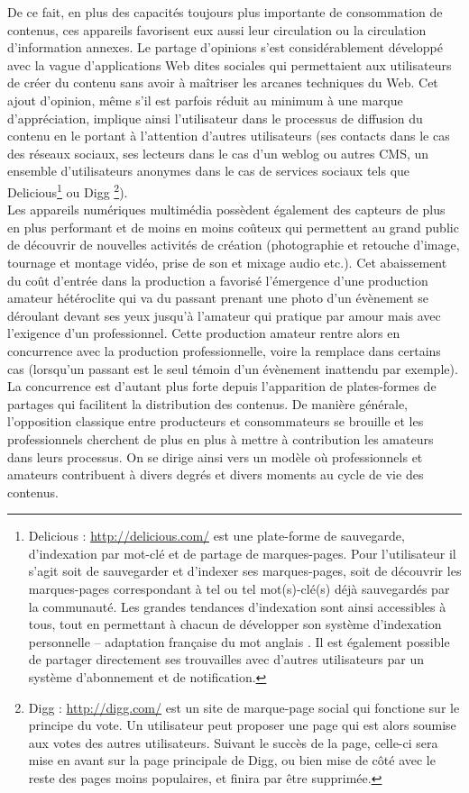 De ce fait, en plus des capacités toujours plus importante de consommation de contenus, ces appareils favorisent eux aussi leur circulation ou la circulation d’information annexes. 
Le partage d’opinions s’est considérablement développé avec la vague d'applications Web dites sociales qui permettaient aux utilisateurs de créer du contenu sans avoir à maîtriser les arcanes techniques du Web. 
Cet ajout d’opinion, même s’il est parfois réduit au minimum à une marque d'appréciation, implique ainsi l’utilisateur dans le processus de diffusion du contenu en le portant à l'attention d'autres utilisateurs (ses contacts dans le cas des réseaux sociaux, ses lecteurs dans le cas d'un weblog ou autres CMS, un ensemble d'utilisateurs anonymes dans le cas de services sociaux tels que Delicious\footnote{Delicious : \url{http://delicious.com/} est une plate-forme de sauvegarde, d'indexation par mot-clé et de partage de marques-pages. Pour l'utilisateur il s'agit soit de sauvegarder et d'indexer ses marques-pages, soit de découvrir les marques-pages correspondant à tel ou tel mot(s)-clé(s) déjà sauvegardés par la communauté. Les grandes tendances d'indexation sont ainsi accessibles à tous, tout en permettant à chacun de développer son système d'indexation personnelle -- adaptation française du mot anglais . Il est également possible de partager directement ses trouvailles avec d'autres utilisateurs par un système d'abonnement et de notification.} ou Digg \footnote{Digg : \url{http://digg.com/} est un site de marque-page social qui fonctione sur le principe du vote. Un utilisateur peut proposer une page qui est alors soumise aux votes des autres utilisateurs. Suivant le succès de la page, celle-ci sera mise en avant sur la page principale de Digg, ou bien mise de côté avec le reste des pages moins populaires, et finira par être supprimée.}).\\


Les appareils numériques multimédia possèdent également des capteurs de plus en plus performant et de moins en moins coûteux qui permettent au grand public de découvrir de nouvelles activités de création (photographie et retouche d’image, tournage et montage vidéo, prise de son et mixage audio etc.).
Cet abaissement du coût d’entrée dans la production a favorisé l'émergence d’une production amateur hétéroclite qui va du passant prenant une photo d’un évènement se déroulant devant ses yeux jusqu’à l’amateur qui pratique par amour mais avec l'exigence d’un professionnel. 
Cette production amateur rentre alors en concurrence avec la production professionnelle, voire la remplace dans certains cas (lorsqu’un passant est le seul témoin d’un évènement inattendu par exemple). 
La concurrence est d'autant plus forte depuis l’apparition de plates-formes de partages qui facilitent la distribution des contenus. 
De manière générale, l’opposition classique entre producteurs et consommateurs se brouille et les professionnels cherchent de plus en plus à mettre à contribution les amateurs dans leurs processus. 
On se dirige ainsi vers un modèle où professionnels et amateurs contribuent à divers degrés et divers moments au cycle de vie des contenus.


